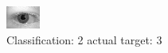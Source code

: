 \begin{figure}[h!]
\begin{center}
\includegraphics[width=0.60\columnwidth]{figures/ID647_class_2_target_3.png}
\end{center}
\caption{ Classification: 2 actual target: 3}
\label{fig:ID647_class_2_target_3}
\end{figure}
